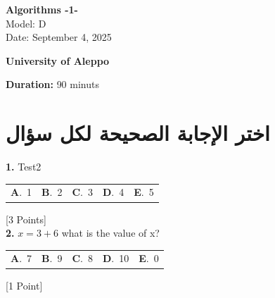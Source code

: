 \documentclass[12pt]{article}
\newcommand{\choice}[2]{\textbf{#1}.~#2}
\begin{document}
\begin{flushright}
{\Large \textbf{{\textenglish{Algorithms -1-}}}}\\[0.25em]
{\normalsize \textenglish{Model: }{\textenglish{D}}}\\[0.1em]
{\normalsize \textenglish{Date: }{\textenglish{September 4, 2025}}}
\end{flushright}

\vspace{0.6cm}

\noindent
\begin{minipage}[t]{0.65\textwidth}
  \raggedright
  \textbf{{\textenglish{University of Aleppo}}}\\[0.3em]
\end{minipage}\hfill
\begin{minipage}[t]{0.3\textwidth}
  \raggedleft
  \textenglish{\textbf{Duration: }}{\textenglish{90 minuts}}
\end{minipage}

\vspace{0.9cm}

\section*{اختر الإجابة الصحيحة لكل سؤال}

\noindent \textbf{\textenglish{1.}} {\textenglish{Test2}}

\begin{tabularx}{\linewidth}{@{}*{5}{Y}@{}}
\choice{A}{{{\textenglish{1}}}} & \choice{B}{{{\textenglish{2}}}} & \choice{C}{{{\textenglish{3}}}} & \choice{D}{{{\textenglish{4}}}} & \choice{E}{{{\textenglish{5}}}} \\
\end{tabularx}
\hfill {\textenglish{[3 Points]}}\\[0.5em]

\noindent \textbf{\textenglish{2.}} \(x=3+6 \){\textenglish{ what is the value of x?}}

\begin{tabularx}{\linewidth}{@{}*{5}{Y}@{}}
\choice{A}{{{\textenglish{7}}}} & \choice{B}{{{\textenglish{9}}}} & \choice{C}{{{\textenglish{8}}}} & \choice{D}{{{\textenglish{10}}}} & \choice{E}{{{\textenglish{0}}}} \\
\end{tabularx}
\hfill {\textenglish{[1 Point]}}\\[0.5em]
\end{document}
